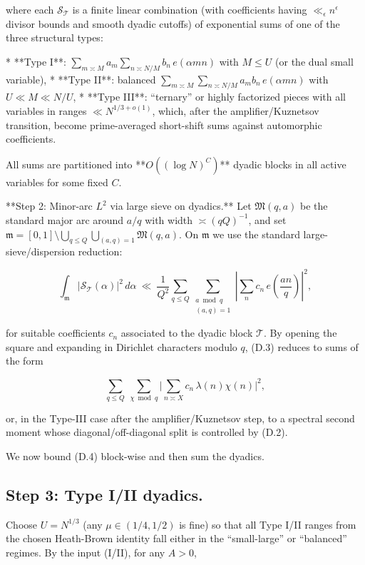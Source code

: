 \documentclass[11pt]{article}
\theoremstyle{definition}
\theoremstyle{remark}
\begin{document}
where each $\mathcal S_{\mathcal T}$ is a finite linear combination (with coefficients having $\ll_\epsilon n^\epsilon$ divisor bounds and smooth dyadic cutoffs) of exponential sums of one of the three structural types:

* **Type I**: $\displaystyle \sum_{m\asymp M} a_m \sum_{n\asymp N/M} b_n\,e(\alpha mn)$ with $M\le U$ (or the dual small variable),
* **Type II**: balanced $\displaystyle \sum_{m\asymp M}\sum_{n\asymp N/M} a_m b_n\,e(\alpha mn)$ with $U\ll M\ll N/U$,
* **Type III**: “ternary” or highly factorized pieces with all variables in ranges $ \ll N^{1/3+o(1)}$, which, after the amplifier/Kuznetsov transition, become prime-averaged short-shift sums against automorphic coefficients.

All sums are partitioned into **$O((\log N)^C)$** dyadic blocks in all active variables for some fixed $C$.

**Step 2: Minor-arc $L^2$ via large sieve on dyadics.**
Let $\mathfrak M(q,a)$ be the standard major arc around $a/q$ with width $\asymp (qQ)^{-1}$, and set $\mathfrak m=[0,1]\setminus \bigcup_{q\le Q}\bigcup_{(a,q)=1}\mathfrak M(q,a)$. On $\mathfrak m$ we use the standard large-sieve/dispersion reduction:

\begin{equation}
	\int_{\mathfrak m} \big|\mathcal S_{\mathcal T}(\alpha)\big|^2\,d\alpha
	\ \ll\ \frac{1}{Q^2}\sum_{q\le Q}\sum_{\substack{a\bmod q\\(a,q)=1}}
	\left|\sum_{n} c_n\,e\!\left(\frac{an}{q}\right)\right|^2,
	\tag{D.3}
\end{equation}

for suitable coefficients $c_n$ associated to the dyadic block $\mathcal T$. By opening the square and expanding in Dirichlet characters modulo $q$, (D.3) reduces to sums of the form

\begin{equation}
	\sum_{q\le Q}\ \sum_{\chi\bmod q}
	\Big|\sum_{n\asymp X} c_n\,\lambda(n)\chi(n)\Big|^2,
	\tag{D.4}
\end{equation}

or, in the Type-III case after the amplifier/Kuznetsov step, to a spectral second moment whose diagonal/off-diagonal split is controlled by (D.2).

We now bound (D.4) block-wise and then sum the dyadics.


\subsection*{Step 3: Type I/II dyadics.}
Choose $U=N^{1/3}$ (any $\mu\in(1/4,1/2)$ is fine) so that all Type I/II ranges from the chosen Heath-Brown identity fall either in the “small-large” or “balanced” regimes. By the input (I/II), for any $A>0$,
\end{document}
